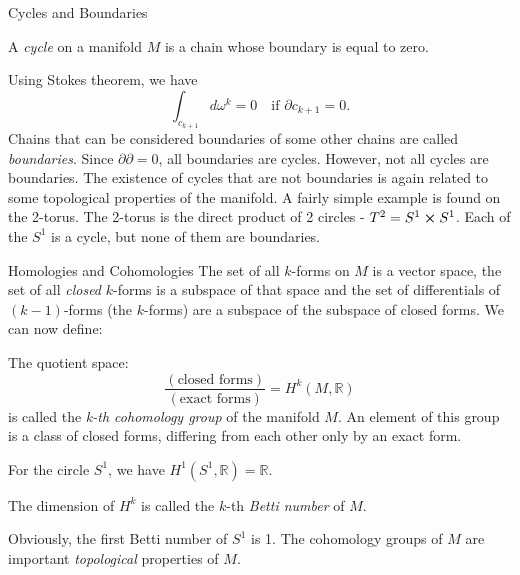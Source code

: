 \begin{subsubsection}{Cycles and Boundaries}
  \begin{definition}
    A \textit{cycle} on a manifold $M$ is a chain whose boundary is equal to
    zero.
  \end{definition}
  Using Stokes theorem, we have
  \begin{equation}
    \int_{c_{k+1}}{d\omega^k} =0\quad \text{if } \partial c_{k+1} =0.
  \end{equation}
  Chains that can be considered boundaries of some other chains are called
  \textit{boundaries}. Since $\partial\partial = 0$, all boundaries are cycles.
  However, not all cycles are boundaries. The existence of cycles that are not
  boundaries is again related to some topological properties of the manifold.
  A fairly simple example is found on the 2-torus. The 2-torus is the direct
  product of 2 circles - $T^2=S^1\cross S^1$. Each of the $S^1$ is a cycle, but
  none of them are boundaries. 

  \begin{subsubsection}{Homologies and Cohomologies}
  The set of all $k$-forms on $M$ is a vector space, the set of all
  \textit{closed} $k$-forms is a subspace of that space and the set of
  differentials of $(k-1)$-forms (the  $k$-forms) are a subspace of
  the subspace of closed forms. We can now define:
  \begin{definition}
    The quotient space:
  \begin{equation}
    \frac{(\text{closed forms})}{(\text{exact forms})} = H^k(M,\mathbb{R})
  \end{equation}
    is called the \textit{k-th cohomology group} of the manifold $M$. An
    element of this group is a class of closed forms, differing from each other
    only by an exact form.
  \end{definition}
  For the circle $S^1$, we have $H^1(S^1,\mathbb{R}) = \mathbb{R}$.
  \begin{definition}
    The dimension of $H^k$ is called the $k$-th \textit{Betti number} of $M$.
  \end{definition}
  Obviously, the first Betti number of $S^1$ is 1. The cohomology groups of $M$ are important \textit{topological}
  properties of $M$.


\end{subsubsection}
\end{subsubsection}
